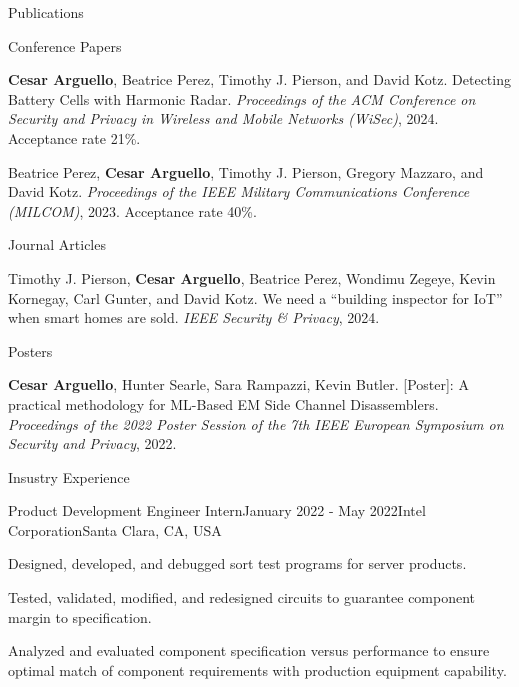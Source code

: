 \documentclass{resume} %
\begin{document}
\begin{rSection}{Publications}
  \begin{rSubsection_Conference}{Conference Papers}
    \item \textbf{Cesar Arguello}, Beatrice Perez, Timothy J. Pierson, and David Kotz. Detecting Battery Cells with Harmonic Radar. \textit{Proceedings of the ACM Conference on Security and Privacy in Wireless and Mobile Networks (WiSec)}, 2024. Acceptance rate 21\%.
    \item Beatrice Perez, \textbf{Cesar Arguello}, Timothy J. Pierson, Gregory Mazzaro, and David Kotz. \textit{Proceedings of the IEEE Military Communications Conference (MILCOM)}, 2023. Acceptance rate 40\%. 
  \end{rSubsection_Conference}

  \begin{rSubsection_Journal}{Journal Articles}
  \item Timothy J. Pierson, \textbf{Cesar Arguello}, Beatrice Perez, Wondimu Zegeye, Kevin Kornegay, Carl Gunter, and David Kotz. We need a “building inspector for IoT” when smart homes are sold. \textit{IEEE Security \& Privacy}, 2024. 
  \end{rSubsection_Journal}

  \begin{rSubsection_Poster}{Posters}
  \item \textbf{Cesar Arguello}, Hunter Searle, Sara Rampazzi, Kevin Butler. [Poster]: A practical methodology for ML-Based EM Side Channel Disassemblers. \textit{Proceedings of the 2022 Poster Session of the 7th IEEE European Symposium on Security and Privacy}, 2022.
  \end{rSubsection_Poster}
\end{rSection}


\begin{rSection}{Insustry Experience}
\begin{rSubsection}{Product Development Engineer Intern}{January 2022 - May 2022}{Intel Corporation}{Santa Clara, CA, USA}
  \item Designed, developed, and debugged sort test programs for server products. 
  \item Tested, validated, modified, and redesigned circuits to guarantee component margin to
specification. 
  \item Analyzed and evaluated component specification versus performance to ensure optimal
match of component requirements with production equipment capability.
\end{rSubsection}
\end{rSection}
\end{document}
